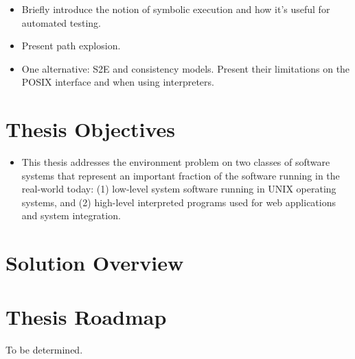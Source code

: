\begin{itemize}
\item Briefly introduce the notion of symbolic execution and how it's useful for automated testing.
\item Present path explosion.
\item One alternative: S2E and consistency models.  Present their limitations on the POSIX interface and when using interpreters.
\end{itemize}


\section{Thesis Objectives}

\begin{itemize}
\item This thesis addresses the environment problem on two classes of software systems that represent an important fraction of the software running in the real-world today: (1) low-level system software running in UNIX operating systems, and (2) high-level interpreted programs used for web applications and system integration.
\end{itemize}


\section{Solution Overview}


\section{Thesis Roadmap}

To be determined.


